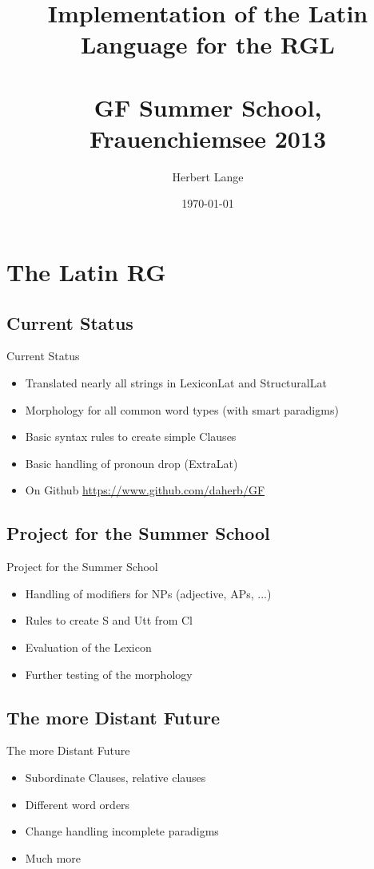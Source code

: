 \documentclass{beamer}
\title[Implementation of the Latin Language for the RGL]{Implementation of the Latin Language for the RGL\\\quad \\ \small{ GF Summer School, Frauenchiemsee 2013 }}
\author{Herbert Lange}
\date{\today}
\begin{document}
\frame{\titlepage}

\section{The Latin RG}
\subsection{Current Status}
\begin{frame}[fragile]{Current Status}
\begin{itemize}
  \item Translated nearly all strings in LexiconLat and StructuralLat
  \item Morphology for all common word types (with smart paradigms)
  \item Basic syntax rules to create simple Clauses
  \item Basic handling of pronoun drop (ExtraLat)
  \item On Github \url{https://www.github.com/daherb/GF}
\end{itemize}
\end{frame}
\subsection{Project for the Summer School}
\begin{frame}{Project for the Summer School}
\begin{itemize}
  \item Handling of modifiers for NPs (adjective, APs, ...)
  \item Rules to create S and Utt from Cl
  \item Evaluation of the Lexicon
  \item Further testing of the morphology
\end{itemize}
\end{frame}
\subsection{The more Distant Future}
\begin{frame}{The more Distant Future}
\begin{itemize}
  \item Subordinate Clauses, relative clauses
  \item Different word orders
  \item Change handling incomplete paradigms
  \item Much more
\end{itemize}
\end{frame}
\end{document}
